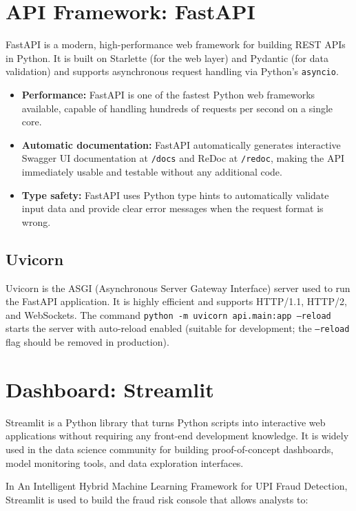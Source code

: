 \section{API Framework: FastAPI}

FastAPI is a modern, high-performance web framework for building REST APIs in Python. It is built on Starlette (for the web layer) and Pydantic (for data validation) and supports asynchronous request handling via Python's \texttt{asyncio}.

\begin{itemize}
    \item \textbf{Performance:} FastAPI is one of the fastest Python web frameworks available, capable of handling hundreds of requests per second on a single core.
    \item \textbf{Automatic documentation:} FastAPI automatically generates interactive Swagger UI documentation at \texttt{/docs} and ReDoc at \texttt{/redoc}, making the API immediately usable and testable without any additional code.
    \item \textbf{Type safety:} FastAPI uses Python type hints to automatically validate input data and provide clear error messages when the request format is wrong.
\end{itemize}

\subsection{Uvicorn}

Uvicorn is the ASGI (Asynchronous Server Gateway Interface) server used to run the FastAPI application. It is highly efficient and supports HTTP/1.1, HTTP/2, and WebSockets. The command \texttt{python -m uvicorn api.main:app --reload} starts the server with auto-reload enabled (suitable for development; the \texttt{--reload} flag should be removed in production).

\section{Dashboard: Streamlit}

Streamlit is a Python library that turns Python scripts into interactive web applications without requiring any front-end development knowledge. It is widely used in the data science community for building proof-of-concept dashboards, model monitoring tools, and data exploration interfaces.

In An Intelligent Hybrid Machine Learning Framework for UPI Fraud Detection, Streamlit is used to build the fraud risk console that allows analysts to:

